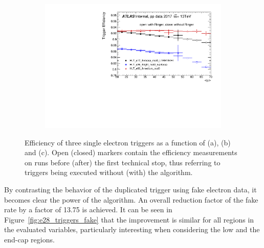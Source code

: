 \begin{figure}[h!tb]
\begin{center}
  \begin{subfigure}[c]{.59\textwidth}
  \centering
  \includegraphics[width=\textwidth]{sections/04_operation/figures/efficiencies/eff_EGAM1_e17_e26_e60_2017_before_and_after_ts1_mu.pdf}
  \caption{}%
  \end{subfigure}
  \caption{Efficiency of three single electron triggers as a function of
  \et (a), \eta (b) and \avgmu (c). Open (closed) markers contain
  the efficiency measurements on runs before (after) the first technical stop, thus referring to
  triggers being executed without (with) the \rnn{} algorithm.
  }%
  \label{fig:2017_ts1}
  \end{center}
\end{figure}


By contrasting the behavior of the duplicated trigger using fake electron data,
it becomes clear the power of the \rnn{} algorithm. An overall reduction factor of
the fake rate by a factor of 13.75 is achieved. It can be seen in
Figure~\ref{fig:e28_triggers_fake} that the improvement is similar for all
regions in the evaluated variables, particularly interesting when
considering the low \et{} and the end-cap regions.




